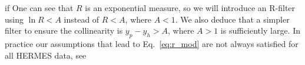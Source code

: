 \documentclass[final,3p,times,onecolumn,sort&compress,hidelinks]{elsarticle}
\newcommand\3[1]{\boldsymbol{#1}}
\newcommand*{\FigPath}{../Figs/}%
\begin{document}
if%
One can see that $R$ is an exponential measure, so we will introduce an R-filter using $\ln R < A$ instead of $R < A$, where $A < 1$. We also deduce that a simpler filter to ensure the collinearity is $y_p-y_h > A$, where $A> 1$ is sufficiently large. In practice our assumptions that lead to Eq.~\eqref{eq:r_mod} are not always satisfied for all HERMES data, see %
\end{document}
